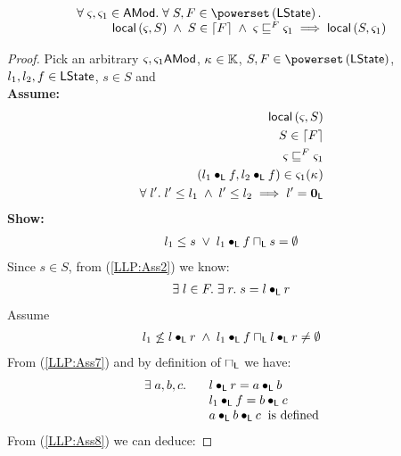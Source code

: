 \begin{lemma}\label{lem:localityPreservation}
%
%
%
\[
\begin{array}{l}
	\for{\amod{}, \amod{1} \in \AMods} \for{S, F \in \pset{\LState}}\\
	\hspace*{1cm}\local{\amod{}}{S} \;\land\; S \in \extend{F} \;\land\; \amod{} \weakenI{F} \amod{1} \implies
	\local{S}{\amod{1}}
\end{array}
\]
%
\begin{proof} 
Pick an arbitrary $\varsigma_{}, \varsigma_{1} \textsf{AMod}$, $\kappa_{} \in \mathbb{K}$, $S, F \in \pset{\LState}$, $l_1, l_2, f \in \textsf{LState}$, $s \in S$ and \\
\textbf{Assume:}
%
\begin{align}
	\textsf{local}\left(\varsigma_{}, S\right) \label{LLP:Ass1}\\
	S \in \left\lceil F \right\rceil \label{LLP:Ass2}\\
	\varsigma_{} \sqsubseteq^{F} \varsigma_{1} \label{LLP:Ass3}\\
	(l_1 \bullet_{\textsf{L}} f, l_2 \bullet_{\textsf{L}} f) \in \varsigma_{1}(\kappa_{}) \label{LLP:Ass4}\\
	\forall\; l'.\; l' \leq l_1 \;\land\; l' \leq l_2 \implies l' = \mathbf{0}_{\textsf{L}} \label{LLP:Ass5}
\end{align}	
%
\textbf{Show:}
%
\begin{align}
	l_1 \leq s \;\lor\; l_1 \bullet_{\textsf{L}} f \sqcap_{\textsf{L}} s = \emptyset \label{LLP:Goal}
\end{align}
%
Since $s \in S$, from (\ref{LLP:Ass2}) we know:
%
\begin{align}
	\exists\; l \in F.\; \exists\; r.\; s = l \bullet_{\textsf{L}} r \label{LLP:Ass6}
\end{align}
%
Assume
%
\begin{align}
	l_1 \not \leq l \bullet_{\textsf{L}} r \;\land\; l_1 \bullet_{\textsf{L}} f \sqcap_{\textsf{L}} l \bullet_{\textsf{L}} r \not= \emptyset \label{LLP:Ass7}
\end{align}
%
From (\ref{LLP:Ass7}) and by definition of $\sqcap_{\textsf{L}}$ we have:
%
\begin{align}
	\begin{array}{l l}
		\exists\; a, b, c.\; \hspace*{0.2cm} & l \bullet_{\textsf{L}} r = a \bullet_{\textsf{L}} b \\
		& l_1 \bullet_{\textsf{L}} f = b \bullet_{\textsf{L}} c \\
		& a \bullet_{\textsf{L}} b \bullet_{\textsf{L}} c \hspace*{0.2cm} \text {is defined}
	\end{array}
	\label{LLP:Ass8}
\end{align}
%
From (\ref{LLP:Ass8}) we can deduce:

\end{proof}
\end{lemma}
